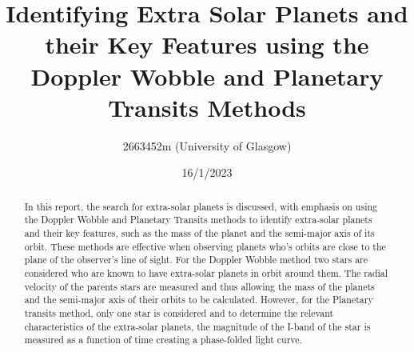 \documentclass[]{article}
\title{\textbf{Identifying Extra Solar Planets and their Key Features using 
the Doppler Wobble and Planetary Transits Methods}}
\author{2663452m (University of Glasgow)}
\date{16/1/2023}
\begin{document}
\maketitle

\begin{abstract}
In this report, the search for extra-solar planets is discussed,
with emphasis on using the Doppler Wobble and Planetary Transits 
methods to identify extra-solar planets and their key features, 
such as the mass of the planet and the semi-major axis of its orbit.
These methods are effective when observing planets who's orbits 
are close to the plane of the observer's line of sight. For the Doppler 
Wobble method two stars are considered who are known to have
extra-solar planets in orbit around them. The radial velocity of 
the parents stars are measured and thus allowing the mass of the 
planets and the semi-major axis of their orbits to be calculated.
However, for the Planetary transits method, only one star is considered
and to determine the relevant characteristics of the extra-solar planets,
the magnitude of the I-band of the star is measured as a function
of time creating a phase-folded light curve.
  



\end{abstract}
\newpage



\twocolumn
\end{document}
